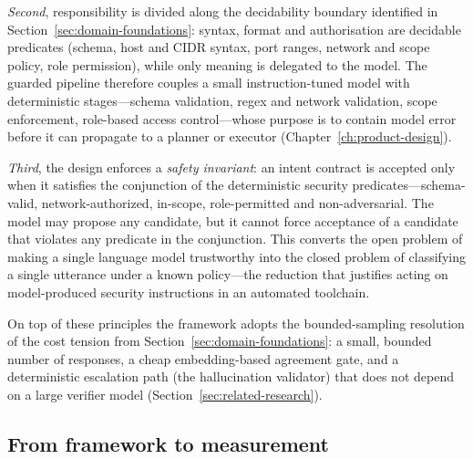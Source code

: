 \emph{Second}, responsibility is divided along the decidability boundary
identified in Section~\ref{sec:domain-foundations}: syntax, format and
authorisation are decidable predicates (schema, host and CIDR syntax, port
ranges, network and scope policy, role permission), while only meaning is
delegated to the model. The guarded pipeline therefore couples a small
instruction-tuned model with deterministic stages---schema validation, regex and
network validation, scope enforcement, role-based access control---whose purpose
is to contain model error before it can propagate to a planner or executor
(Chapter~\ref{ch:product-design}).

\emph{Third}, the design enforces a \emph{safety invariant}: an intent contract
is accepted only when it satisfies the conjunction of the deterministic security
predicates---schema-valid, network-authorized, in-scope, role-permitted and
non-adversarial. The model may propose any candidate, but it cannot force
acceptance of a candidate that violates any predicate in the conjunction. This
converts the open problem of making a single language model trustworthy into the
closed problem of classifying a single utterance under a known policy---the
reduction that justifies acting on model-produced security instructions in an
automated toolchain.

On top of these principles the framework adopts the bounded-sampling resolution
of the cost tension from Section~\ref{sec:domain-foundations}: a small, bounded
number of responses, a cheap embedding-based agreement gate, and a deterministic
escalation path (the hallucination validator) that does not depend on a large
verifier model (Section~\ref{sec:related-research}).

\subsection*{From framework to measurement}

